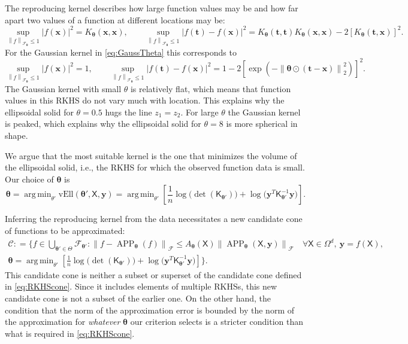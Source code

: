 \documentclass[]{mcom-l}
\theoremstyle{plain}
\theoremstyle{definition}
\newcommand{\vEll}{\text{vEll}}
\DeclareMathOperator*{\argmin}{arg\,min}
\DeclareMathOperator{\APP}{APP}
\newcommand{\mK}{\mathsf{K}}
\newcommand{\mX}{\mathsf{X}}
\newcommand{\bx}{{\boldsymbol{x}}}
\newcommand{\by}{{\boldsymbol{y}}}
\newcommand{\bt}{{\boldsymbol{t}}}
\newcommand{\btheta}{{\boldsymbol{\theta}}}
\newcommand{\calc}{{\mathcal{C}}}
\newcommand{\calf}{{\mathcal{F}}}
\def\abs#1{\ensuremath{\left \lvert #1 \right \rvert}}
\newcommand{\norm}[2][{}]{\ensuremath{\left \lVert #2 \right \rVert}_{#1}}
\newcommand{\bignorm}[2][{}]{\ensuremath{\bigl \lVert #2 \bigr \rVert}_{#1}}
\begin{document}
The reproducing kernel describes how large function values may be and how far apart two values of a function at different locations may be:
\begin{equation} \label{eq:diff_fnew}
\sup_{\norm[\calf_{\btheta}]{f} \le 1} \abs{f(\bx)}^2 = K_\btheta(\bx,\bx), \qquad    \sup_{\norm[\calf_{\btheta}]{f} \le 1} \abs{f(\bt) - f(\bx)}^2 = K_{\btheta}(\bt,\bt) K_{\btheta}(\bx,\bx) - 2 [K_{\btheta}(\bt,\bx)]^2.
\end{equation}
For the Gaussian kernel in \eqref{eq:GaussTheta} this corresponds to 
\begin{equation} \label{eq:diff_f_Gaussnew}
\sup_{\norm[\calf_{\btheta}]{f} \le 1} \abs{f(\bx)}^2 = 1, \qquad 
\sup_{\norm[\calf_{\btheta}]{f} \le 1} \abs{f(\bt) - f(\bx)}^2 = 1 - 2 [\exp(-\norm[2]{\btheta \odot (\bt-\bx)}^2)]^2.
\end{equation}
The Gaussian kernel with small $\theta$ is relatively flat, which means that function values in this RKHS do not vary much with location.  This explains why the ellipsoidal solid for $\theta = 0.5$ hugs the line $z_1 = z_2$.  For large $\theta$ the Gaussian kernel is peaked, which explains why the ellipsoidal solid for $\theta = 8$ is more spherical in shape.

We argue that the most suitable kernel is the one that minimizes the volume of the ellipsoidal solid, i.e., the RKHS for which the observed function data is small.   Our choice of $\btheta$ is
\begin{equation} \label{eq:thetEB}
\btheta  =  \argmin_{\theta'}  \vEll(\btheta' ,\mX,\by) 
 = \argmin_{\theta'}  \left[\frac 1n \log \bigl( \det(\mK_{\btheta'}) \bigr) + \log \bigl ( \by^T \mK_{\btheta'}^{-1} \by \bigr)\right].
\end{equation}

Inferring the reproducing kernel from the data necessitates a new candidate cone of functions to be approximated:
\begin{multline} \label{eq:RKHSconeTheta}
\calc : = \biggl \{f \in \bigcup_{\btheta' \in \Theta} \calf_{\btheta'} : \bignorm[\calf]{f - \APP_{\btheta}(f)} \le A_{\btheta}(\mX) \bignorm[\calf]{\APP_{\btheta}(\mX,\by)} \quad \forall \mX \in \Omega^d, \ \by = f(\mX),  \\
 \btheta = \argmin_{\theta'}  \left[\frac 1n \log \bigl( \det(\mK_{\btheta'}) \bigr) + \log \bigl ( \by^T \mK_{\btheta'}^{-1} \by \bigr)\right] \biggr \}.
\end{multline}
This candidate cone is neither a subset or superset of the candidate cone defined in \eqref{eq:RKHScone}.  Since it includes elements of multiple RKHSs, this new candidate cone is not a subset of the earlier one.  On the other hand, the condition that  the norm of the approximation error  is bounded by the norm of the approximation for \emph{whatever} $\btheta$ our criterion selects is a stricter condition than what is required in \eqref{eq:RKHScone}. 
\end{document}
